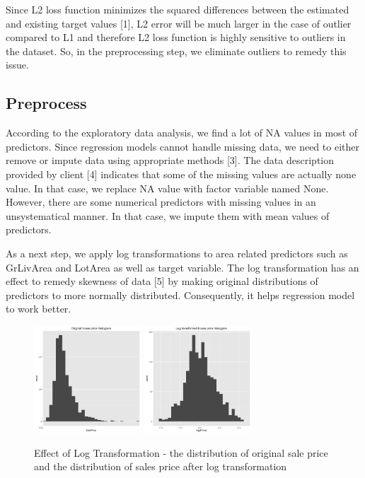 \documentclass[letterpaper, 10 pt, conference]{ieeeconf}\usepackage[]{graphicx}\usepackage[]{color}
\begin{document}
Since L2 loss function minimizes the squared differences between the estimated and existing target values [1], L2 error will be much larger in the case of outlier compared to L1 and therefore L2 loss function is highly sensitive to outliers in the dataset. So, in the preprocessing step, we eliminate outliers to remedy this issue.

\subsection{Preprocess}
According to the exploratory data analysis, we find a lot of NA values in most of predictors. Since regression models cannot handle missing data, we need to either remove or impute data using appropriate methods [3]. The data description provided by client [4] indicates that some of the missing values are actually none value. In that case, we replace NA value with factor variable named None. However, there are some numerical predictors with missing values in an unsystematical manner. In that case, we impute them with mean values of predictors.

As a next step, we apply log transformations to area related predictors such as GrLivArea and LotArea as well as target variable. The log transformation has an effect to remedy skewness of data [5] by making original distributions of predictors to more normally distributed. Consequently, it helps regression model to work better.

   \begin{figure}[thpb]
      \centering
      \includegraphics[width =  4cm, height = 4cm]{../images/historgram_original_price.png}
      \includegraphics[width =  4cm, height = 4cm]{../images/historgram_log_trasformed_price.png}
      \caption{Effect of Log Transformation - the distribution of original sale price and the distribution of sales price after log transformation}
      \label{figurelabel}
   \end{figure}
   
\end{document}
